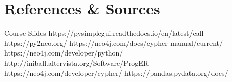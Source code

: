 \documentclass[a4paper,12pt]{article}
\begin{document}
\newpage
\section{References \& Sources}
  \begin{thebibliography}{9}
    \bibitem{} Course Slides
    \bibitem{} https://pysimplegui.readthedocs.io/en/latest/call%
    \bibitem{} https://py2neo.org/
    \bibitem{} https://neo4j.com/docs/cypher-manual/current/
    \bibitem{} https://neo4j.com/developer/python/
    \bibitem{} http://iniball.altervista.org/Software/ProgER
    \bibitem{} https://neo4j.com/developer/cypher/
    \bibitem{} https://pandas.pydata.org/docs/
  \end{thebibliography}
\end{document}
